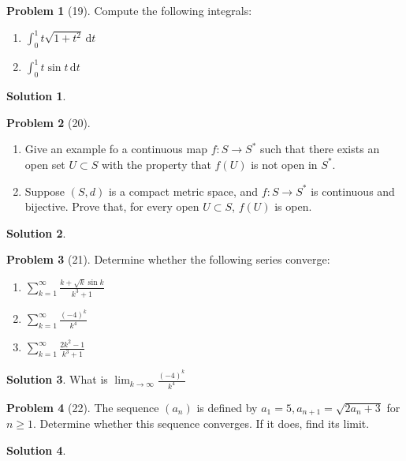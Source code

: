 \documentclass[12pt]{article}
\theoremstyle{definition} %
\newtheorem{solution}{Solution}
\newtheorem{problem}{Problem}
\theoremstyle{plain} %
\begin{document}
\begin{problem}[19]
   Compute the following integrals:
   \begin{enumerate}
    \item $\int_{0}^{1} t\sqrt{1+t^{2}}  \,\mathrm{d}t $
    \item $\int_{0}^{1} t \sin t \,\mathrm{d}t $  
   \end{enumerate} 
\end{problem}
\begin{solution}
    
\end{solution}
\begin{problem}[20]
   \begin{enumerate}
    \item Give an example fo a continuous map $f: S\to S^{*}$ such that there exists an open set $U \subset S$ with the property that $f(U)$ is not open in $S^{*}$.
    \item Suppose $(S,d)$ is a compact metric space, and $f:S\to S^{*}$ is continuous and bijective. Prove that, for every open $U \subset S$, $f(U)$ is open.       
   \end{enumerate} 
\end{problem}
\begin{solution}
    
\end{solution}
\begin{problem}[21]
   Determine whether the following series converge: 
   \begin{enumerate}
    \item $\sum_{k=1}^{\infty} \frac{k+\sqrt{k} \sin k}{k^{3}+1}$
    \item $\sum_{k=1}^{\infty} \frac{(-4)^{k}}{k^{4}}$
    \item $\sum_{k=1}^{\infty} \frac{2k^{2}-1}{k^{3}+1}$   
   \end{enumerate} 
\end{problem}
\begin{solution}
What is $\lim_{k \to \infty} \frac{(-4)^{k}}{k^{4}}$ 
\end{solution}
\begin{problem}[22]
   The sequence $(a_{n})$ is defined by $a_1=5, a_{n+1}=\sqrt{2a_{n}+3} $ for $n\geq 1$. Determine whether this sequence converges. If it does, find its limit.    
\end{problem}
\begin{solution}
    
\end{solution}
\end{document}
